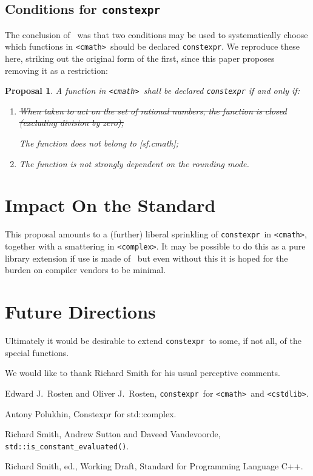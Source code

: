 \documentclass[prd,twocolumn,amsmath,amssymb,nofootinbib,eqsecnum]{revtex4-1}
\newcommand{\constexpr}{\code{constexpr}\xspace}
\newcommand{\code}[1]{{\tt #1}}
\newcommand{\header}[1]{{\tt <#1>}}
\newcommand{\cmath}{\header{cmath}}
\newcommand{\complex}{\header{complex}}
\newcommand{\cstdlib}{\header{cstdlib}}
\newtheorem*{proposal*}{Proposal}
\begin{document}
\subsection{Conditions for \constexpr}

The conclusion of~\cite{Rosten-constexpr} was that two conditions may be used to systematically choose which functions in \cmath\ should be declared \constexpr. We reproduce these here, striking out the original form of the first, since this paper proposes removing it as a restriction:

\begin{proposal*}
	A function in \cmath\ shall be declared \constexpr if and only if:
	\begin{enumerate}
		\item \st{When taken to act on the set of rational numbers, the function is closed (excluding division 
		by zero);}
		
		The function does not belong to [sf.cmath];
		
		\item The function is not strongly dependent on the rounding mode.
	\end{enumerate}
\end{proposal*}



\section{Impact On the Standard}

This proposal amounts to a (further) liberal sprinkling of \constexpr\ in \cmath, together with a smattering in \complex. It may be possible to do this as a pure library extension if use is made of~\cite{ConstEval} but even without this it is hoped for the burden on compiler vendors to be minimal.

\section{Future Directions}

Ultimately it would be desirable to extend \constexpr\ to some, if not all, of the special functions.


\begin{acknowledgments}
	We would like to thank Richard Smith for his usual perceptive comments.
\end{acknowledgments}


\begin{thebibliography}{1}
	 Edward J.~Rosten and Oliver J.~Rosten, \constexpr\ for \cmath\ and \cstdlib.

	 Antony Polukhin, Constexpr for std::complex.	
	
	 Richard Smith, Andrew Sutton and Daveed Vandevoorde, \code{std\!::\!is\_constant\_evaluated()}.
	
	 Richard Smith, ed., Working Draft, Standard for Programming Language C++.	
	
\end{thebibliography}
\end{document}
